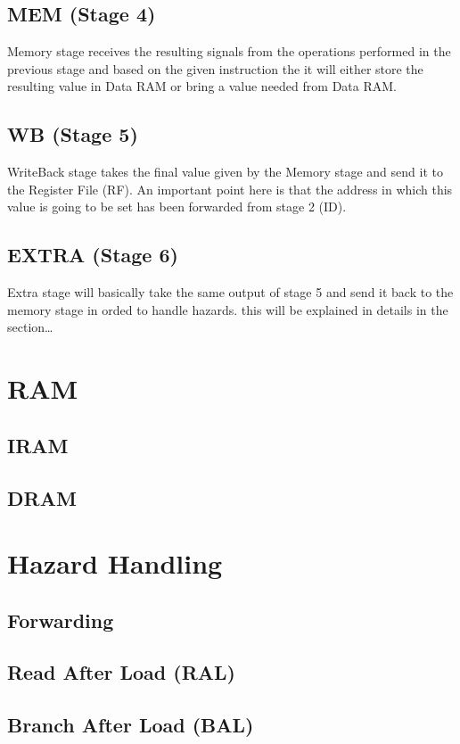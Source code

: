 \subsection[MEM (Stage 4)]{MEM (Stage 4)}
Memory stage receives the resulting signals from the operations performed in the previous stage and based on the given instruction
the it will either store the resulting value in Data RAM or bring a value needed from Data RAM.

\subsection[WB (Stage 5)]{WB (Stage 5)}
WriteBack stage takes the final value given by the Memory stage and send it to the Register File (RF). An important point here is
that the address in which this value is going to be set has been forwarded from stage 2 (ID).

\subsection[EXTRA (Stage 6)]{EXTRA (Stage 6)}
Extra stage will basically take the same output of stage 5 and send it back to the memory stage in orded to handle hazards. this will be explained in details in the section… 


\section[RAM]{RAM}
\subsection[IRAM]{IRAM}
\subsection[DRAM]{DRAM}

\section[Hazard Handling]{Hazard Handling}
\label{ch:hazard}
\subsection[Forwarding]{Forwarding}
\subsection[Read After Load (RAL)]{Read After Load (RAL)}
\subsection[Branch After Load (BAL)]{Branch After Load (BAL)}
